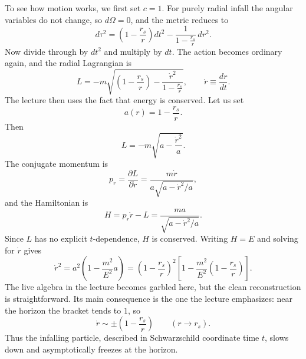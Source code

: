 To see how motion works, we first set \(c=1\). For purely radial infall the angular variables do not change, so \(d\Omega=0\), and the metric reduces to
\begin{equation}
d\tau^2
=
\left(1-\frac{r_s}{r}\right)dt^2
-
\frac{1}{1-\frac{r_s}{r}}\,dr^2.
\end{equation}
Now divide through by \(dt^2\) and multiply by \(dt\). The action becomes ordinary again, and the radial Lagrangian is
\begin{equation}
L=-m\sqrt{\left(1-\frac{r_s}{r}\right)-\frac{\dot r^2}{1-\frac{r_s}{r}}},
\qquad
\dot r \equiv \frac{dr}{dt}.
\end{equation}
The lecture then uses the fact that energy is conserved. Let us set
\begin{equation}
a(r)=1-\frac{r_s}{r}.
\end{equation}
Then
\begin{equation}
L=-m\sqrt{a-\frac{\dot r^2}{a}}.
\end{equation}
The conjugate momentum is
\begin{equation}
p_r=\frac{\partial L}{\partial \dot r}
=
\frac{m\dot r}{a\sqrt{a-\dot r^2/a}},
\end{equation}
and the Hamiltonian is
\begin{equation}
H=p_r\dot r-L
=
\frac{ma}{\sqrt{a-\dot r^2/a}}.
\end{equation}
Since \(L\) has no explicit \(t\)-dependence, \(H\) is conserved. Writing \(H=E\) and solving for \(\dot r\) gives
\begin{equation}
\dot r^2
=
a^2\left(1-\frac{m^2}{E^2}a\right)
=
\left(1-\frac{r_s}{r}\right)^2
\left[1-\frac{m^2}{E^2}\left(1-\frac{r_s}{r}\right)\right].
\end{equation}
The live algebra in the lecture becomes garbled here, but the clean reconstruction is straightforward. Its main consequence is the one the lecture emphasizes: near the horizon the bracket tends to \(1\), so
\begin{equation}
\dot r \sim \pm\left(1-\frac{r_s}{r}\right)
\qquad
(r\to r_s).
\end{equation}
Thus the infalling particle, described in Schwarzschild coordinate time \(t\), slows down and asymptotically freezes at the horizon.

